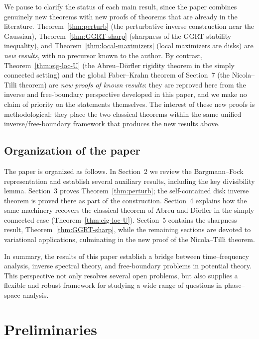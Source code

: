 \documentclass[a4paper,11pt,reqno]{amsart}
\numberwithin{equation}{section}
\theoremstyle{plain} %
\theoremstyle{definition} %
\theoremstyle{remark}
\begin{document}
We pause to clarify the status of each main result, since the paper combines genuinely new theorems with new proofs of theorems that are already in the literature. Theorem~\ref{thm:perturb} (the perturbative inverse construction near the Gaussian), Theorem~\ref{thm:GGRT-sharp} (sharpness of the GGRT stability inequality), and Theorem~\ref{thm:local-maximizers} (local maximizers are disks) are \emph{new results}, with no precursor known to the author. By contrast, Theorem~\ref{thm:eig-loc-U} (the Abreu--D\"orfler rigidity theorem in the simply connected setting) and the global Faber--Krahn theorem of Section~7 (the Nicola--Tilli theorem) are \emph{new proofs of known results}: they are reproved here from the inverse and free-boundary perspective developed in this paper, and we make no claim of priority on the statements themselves. The interest of these new proofs is methodological: they place the two classical theorems within the same unified inverse/free-boundary framework that produces the new results above.

\subsection{Organization of the paper}

The paper is organized as follows. In Section~2 we review the Bargmann--Fock representation and establish several auxiliary results, including the key divisibility lemma. Section~3 proves Theorem~\ref{thm:perturb}; the self-contained disk inverse theorem is proved there as part of the construction. Section~4 explains how the same machinery recovers the classical theorem of Abreu and D\"orfler in the simply connected case (Theorem~\ref{thm:eig-loc-U}). Section~5 contains the sharpness result, Theorem~\ref{thm:GGRT-sharp}, while the remaining sections are devoted to variational applications, culminating in the new proof of the Nicola--Tilli theorem.

\medskip

In summary, the results of this paper establish a bridge between time--frequency analysis, inverse spectral theory, and free-boundary problems in potential theory. This perspective not only resolves several open problems, but also supplies a flexible and robust framework for studying a wide range of questions in phase--space analysis.

\section{Preliminaries}
\end{document}

